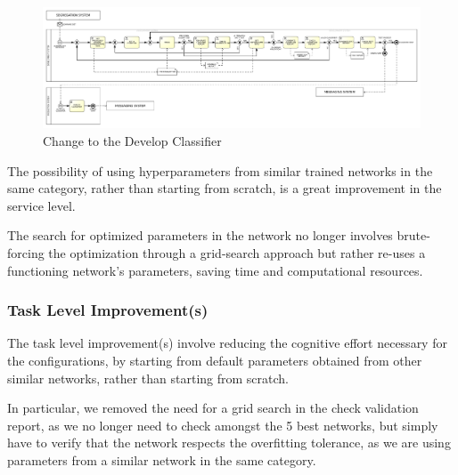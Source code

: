 \begin{figure}[H]
    \centering
    \includegraphics[width=1\textwidth]{figures/TO-BE Business Diagram - Develop Classifier.pdf}
    \caption{Change to the Develop Classifier}
    \label{fig:to_be_develop_classifier}
\end{figure}

The possibility of using hyperparameters from similar trained networks in the same category, rather than starting from scratch, is a great improvement in the service level.

The search for optimized parameters in the network no longer involves brute-forcing the optimization through a grid-search approach but rather re-uses a functioning network's parameters, saving time and computational resources.



\subsubsection{Task Level Improvement(s)}
\label{subsec:task_level_improvements}

The task level improvement(s) involve reducing the cognitive effort necessary for the configurations, by starting from default parameters obtained from other similar networks, rather than starting from scratch.

In particular, we removed the need for a grid search in the check validation report, as we no longer need to check amongst the 5 best networks, but simply have to verify that the network respects the overfitting tolerance, as we are using parameters from a similar network in the same category.

